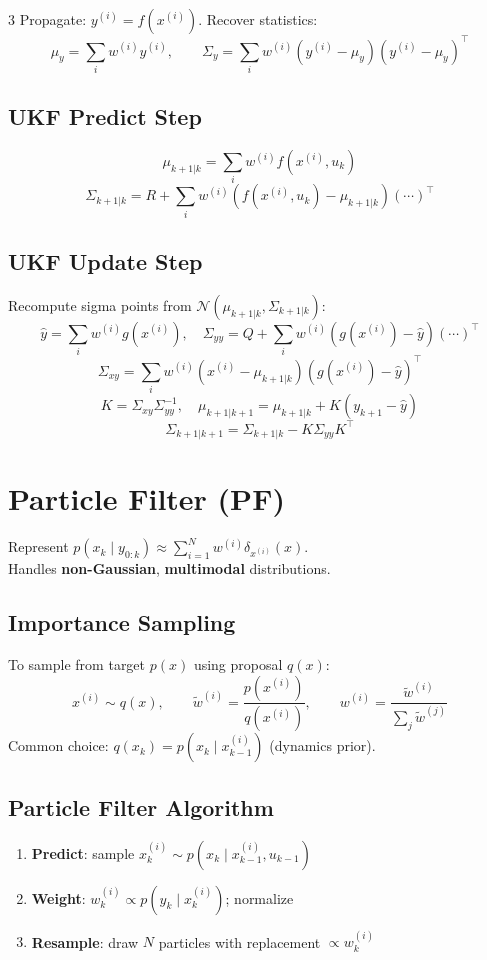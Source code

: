 \documentclass[9pt,landscape]{article}
\begin{document}
\begin{multicols}{3}
Propagate: $y^{(i)}=f(x^{(i)})$. Recover statistics:
\[\mu_y=\sum_i w^{(i)}y^{(i)},\qquad \Sigma_y=\sum_i w^{(i)}(y^{(i)}-\mu_y)(y^{(i)}-\mu_y)^\top\]

\subsection{UKF Predict Step}
\[\mu_{k+1|k}=\sum_i w^{(i)}f(x^{(i)},u_k)\]
\[\Sigma_{k+1|k}=R+\sum_i w^{(i)}(f(x^{(i)},u_k)-\mu_{k+1|k})(\cdots)^\top\]

\subsection{UKF Update Step}
Recompute sigma points from $\mathcal{N}(\mu_{k+1|k},\Sigma_{k+1|k})$:
\[\hat y=\sum_i w^{(i)}g(x^{(i)}),\quad \Sigma_{yy}=Q+\sum_i w^{(i)}(g(x^{(i)})-\hat y)(\cdots)^\top\]
\[\Sigma_{xy}=\sum_i w^{(i)}(x^{(i)}-\mu_{k+1|k})(g(x^{(i)})-\hat y)^\top\]
\[K=\Sigma_{xy}\Sigma_{yy}^{-1},\quad \mu_{k+1|k+1}=\mu_{k+1|k}+K(y_{k+1}-\hat y)\]
\[\Sigma_{k+1|k+1}=\Sigma_{k+1|k}-K\Sigma_{yy}K^\top\]

\section{Particle Filter (PF)}

Represent $p(x_k\mid y_{0:k})\approx\sum_{i=1}^N w^{(i)}\delta_{x^{(i)}}(x)$.\\
Handles \textbf{non-Gaussian}, \textbf{multimodal} distributions.

\subsection{Importance Sampling}
To sample from target $p(x)$ using proposal $q(x)$:
\[x^{(i)}\sim q(x),\qquad \tilde w^{(i)}=\frac{p(x^{(i)})}{q(x^{(i)})},\qquad w^{(i)}=\frac{\tilde w^{(i)}}{\sum_j \tilde w^{(j)}}\]
Common choice: $q(x_k)=p(x_k\mid x_{k-1}^{(i)})$ (dynamics prior).

\subsection{Particle Filter Algorithm}
\begin{enumerate}
  \item \textbf{Predict}: sample $x_k^{(i)}\sim p(x_k\mid x_{k-1}^{(i)},u_{k-1})$
  \item \textbf{Weight}: $w_k^{(i)}\propto p(y_k\mid x_k^{(i)})$; normalize
  \item \textbf{Resample}: draw $N$ particles with replacement $\propto w_k^{(i)}$
\end{enumerate}


\end{multicols}
\end{document}
